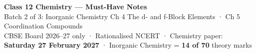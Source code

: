 \documentclass[10pt,a4paper]{extarticle}
\begin{document}
\small

\begin{tcolorbox}[enhanced,colback=navy,colframe=navy,arc=2pt,left=8pt,right=8pt,top=6pt,bottom=6pt]
\color{white}\sffamily
{\LARGE\bfseries Class 12 Chemistry — Must-Have Notes}\\[3pt]
{\large Batch 2 of 3: Inorganic Chemistry} \hfill {\small Ch 4 The d- and f-Block Elements · Ch 5 Coordination Compounds}\\[2pt]
{\footnotesize CBSE Board 2026--27 only · Rationalised NCERT · Chemistry paper: \textbf{Saturday 27 February 2027} · Inorganic Chemistry = \textbf{14 of 70} theory marks}
\end{tcolorbox}
\end{document}
